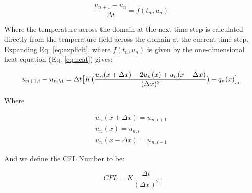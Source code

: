 \documentclass[10pt, letter, showtrims]{extarticle}
\begin{document}
		\begin{equation}
		\label{eq:explicit}
			\frac{u_{n+1} - u_{n}}{\Delta t} = f(t_{n}, u_{n})
		\end{equation}
		
		\noindent
		Where the temperature across the domain at the next time step is calculated directly from the temperature field across the domain at the current time step. \\
		
		\noindent
		Expanding Eq. \ref{eq:explicit}, where $f(t_{n}, u_{n})$ is given by the one-dimensional heat equation (Eq. \ref{eq:heat}) gives:
		
		
		\begin{equation}
			u_{n+1,i} - u_{n,\i} = \Delta t \big[ K \big(\frac{u_{n}(x + \Delta x) - 2 u_{n}(x) + u_{n}(x - \Delta x)}{(\Delta x)^{2}}\big) + q_{n}(x) \big]_{i}
		\end{equation}
		
		\noindent
		Where
		
		\begin{equation}
		\label{eq:delta}
			\begin{split}
				u_{n}(x + \Delta x) = u_{n,i+1} \\
				u_{n}(x)            = u_{n,i} \\
				u_{n}(x - \Delta x) = u_{n,i-1}
			\end{split}
		\end{equation}
		
%		
		
		\noindent
		And we define the CFL Number to be:
		
		\begin{equation}
		\label{eq:cfl}
			CFL = K \frac{\Delta t}{(\Delta x)^{2}}
		\end{equation}
		
\end{document}

